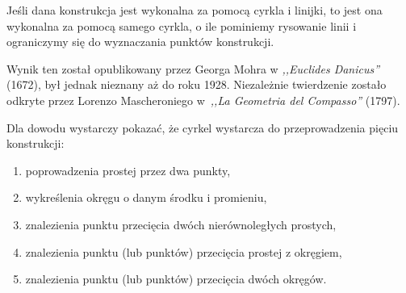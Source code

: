 %

\begin{theorem}
    Jeśli dana konstrukcja jest wykonalna za pomocą cyrkla i linijki, to jest ona wykonalna za pomocą samego cyrkla, o ile pominiemy rysowanie linii i ograniczymy się do wyznaczania punktów konstrukcji.
\end{theorem}

Wynik ten został opublikowany przez Georga Mohra w \emph{,,Euclides Danicus''} (1672), był jednak nieznany aż do roku 1928. %
Niezależnie twierdzenie zostało odkryte przez Lorenzo Mascheroniego w~\emph{,,La Geometria del Compasso''} (1797).
%
%

Dla dowodu wystarczy pokazać, że cyrkel wystarcza do przeprowadzenia pięciu konstrukcji:
\begin{enumerate}
    \item poprowadzenia prostej przez dwa punkty,
    \item wykreślenia okręgu o danym środku i promieniu,
    \item znalezienia punktu przecięcia dwóch nierównoległych prostych,
    \item znalezienia punktu (lub punktów) przecięcia prostej z okręgiem,
    \item znalezienia punktu (lub punktów) przecięcia dwóch okręgów.
\end{enumerate}

%